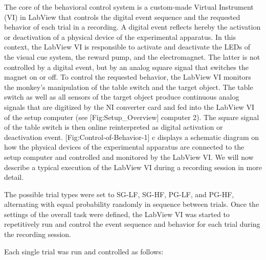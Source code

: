 {The core of the behavioral control system is a custom-made Virtual Instrument (VI) in LabView that controls the digital event sequence and the requested behavior of each trial in a recording. A digital event reflects hereby the activation or deactivation of a physical device of the experimental apparatus. In this context, the LabView VI is responsible to activate and deactivate the LEDs of the visual cue system, the reward pump, and the electromagnet. The latter is not controlled by a digital event, but by an analog square signal that switches the magnet on or off. To control the requested behavior, the LabView VI monitors the monkey's manipulation of the table switch and the target object. The table switch as well as all sensors of the target object produce continuous analog signals that are digitized by the NI converter card and fed into the LabView VI of the setup computer (see [Fig:Setup\_Overview] computer 2). The square signal of the table switch is then online reinterpreted as digital activation or deactivation event. [Fig:Control-of-Behavior-1] c displays a schematic diagram on how the physical devices of the experimental apparatus are connected to the setup computer and controlled and monitored by the LabView VI. We will now describe a typical execution of the LabView VI during a recording session in more detail. 

The possible trial types were set to SG-LF, SG-HF, PG-LF, and PG-HF, alternating with equal probability randomly in sequence between trials. Once the settings of the overall task were defined, the LabView VI was started to repetitively run and control the event sequence and behavior for each trial during the recording session. 

Each single trial was run and controlled as follows: 

}
